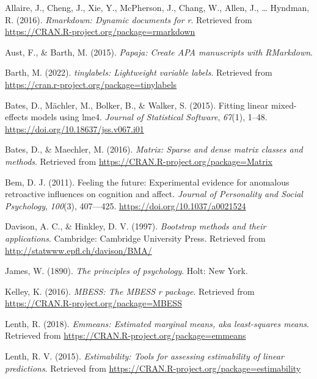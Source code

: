 \documentclass[
  man,floatsintext]{apa6}
\newlength{\cslentryspacing}
\begin{document}
\label{refs}
\setlength{\cslentryspacing}{0em}
\begin{CSLReferences}
Allaire, J., Cheng, J., Xie, Y., McPherson, J., Chang, W., Allen, J., \ldots{} Hyndman, R. (2016). \emph{Rmarkdown: Dynamic documents for r}. Retrieved from \url{https://CRAN.R-project.org/package=rmarkdown}

Aust, F., \& Barth, M. (2015). \emph{Papaja: Create APA manuscripts with RMarkdown}.

Barth, M. (2022). \emph{{tinylabels}: Lightweight variable labels}. Retrieved from \url{https://cran.r-project.org/package=tinylabels}

Bates, D., Mächler, M., Bolker, B., \& Walker, S. (2015). Fitting linear mixed-effects models using {lme4}. \emph{Journal of Statistical Software}, \emph{67}(1), 1--48. \url{https://doi.org/10.18637/jss.v067.i01}

Bates, D., \& Maechler, M. (2016). \emph{Matrix: Sparse and dense matrix classes and methods}. Retrieved from \url{https://CRAN.R-project.org/package=Matrix}

Bem, D. J. (2011). Feeling the future: Experimental evidence for anomalous retroactive influences on cognition and affect. \emph{Journal of Personality and Social Psychology}, \emph{100}(3), 407---425. \url{https://doi.org/10.1037/a0021524}

Davison, A. C., \& Hinkley, D. V. (1997). \emph{Bootstrap methods and their applications}. Cambridge: Cambridge University Press. Retrieved from \url{http://statwww.epfl.ch/davison/BMA/}

James, W. (1890). \emph{The principles of psychology}. Holt: New York.

Kelley, K. (2016). \emph{MBESS: The MBESS r package}. Retrieved from \url{https://CRAN.R-project.org/package=MBESS}

Lenth, R. (2018). \emph{Emmeans: Estimated marginal means, aka least-squares means}. Retrieved from \url{https://CRAN.R-project.org/package=emmeans}

Lenth, R. V. (2015). \emph{Estimability: Tools for assessing estimability of linear predictions}. Retrieved from \url{https://CRAN.R-project.org/package=estimability}


\end{CSLReferences}
\end{document}
